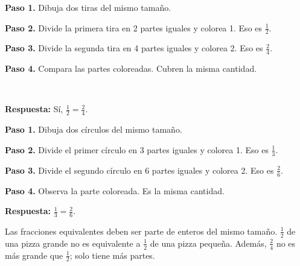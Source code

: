 \begin{wbexample}
\textbf{Paso 1.} Dibuja dos tiras del mismo tamaño.

\textbf{Paso 2.} Divide la primera tira en 2 partes iguales y colorea 1. Eso es $\frac{1}{2}$.

\textbf{Paso 3.} Divide la segunda tira en 4 partes iguales y colorea 2. Eso es $\frac{2}{4}$.

\textbf{Paso 4.} Compara las partes coloreadas. Cubren la misma cantidad.

\begin{center}
\\[2pt]
\end{center}

\textbf{Respuesta:} Sí, $\frac{1}{2}=\frac{2}{4}$.
\end{wbexample}

\begin{wbexample}
\textbf{Paso 1.} Dibuja dos círculos del mismo tamaño.

\textbf{Paso 2.} Divide el primer círculo en 3 partes iguales y colorea 1. Eso es $\frac{1}{3}$.

\textbf{Paso 3.} Divide el segundo círculo en 6 partes iguales y colorea 2. Eso es $\frac{2}{6}$.

\textbf{Paso 4.} Observa la parte coloreada. Es la misma cantidad.

\begin{center}
\hspace{1cm}
\end{center}

\textbf{Respuesta:} $\frac{1}{3}=\frac{2}{6}$.
\end{wbexample}

\begin{wbtip}[Cuidado]
Las fracciones equivalentes deben ser parte de enteros del mismo tamaño. $\frac{1}{2}$ de una pizza grande no es equivalente a $\frac{1}{2}$ de una pizza pequeña. Además, $\frac{2}{4}$ no es más grande que $\frac{1}{2}$; solo tiene más partes.
\end{wbtip}

